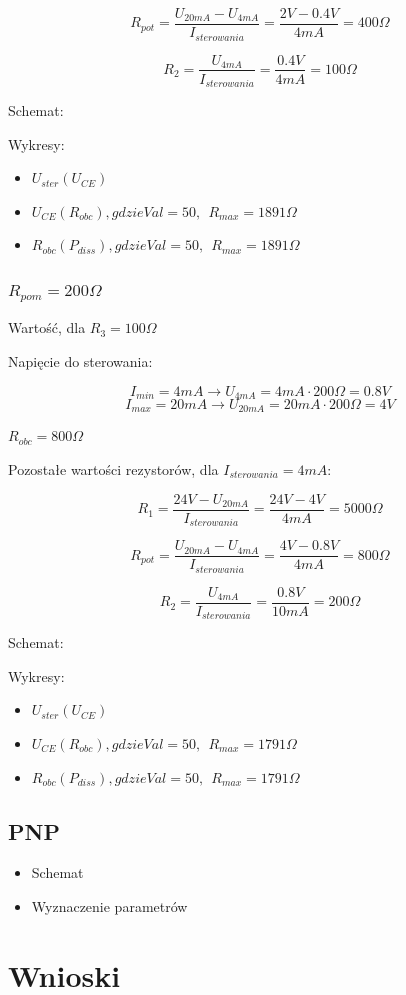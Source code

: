 \documentclass{article}
\begin{document}
$$
    R_{pot} = \frac{U_{20mA} - U_{4mA}}{I_{sterowania}} = 
    \frac{2V-0.4V}{4mA} = 400 \Omega
$$


$$
    R_{2} = \frac{U_{4mA}}{I_{sterowania}} = \frac{0.4V}{4mA} = 100 \Omega
$$

Schemat:

Wykresy:

\begin{itemize}
    \item $U_{ster}(U_{CE})$
    \item $U_{CE}(R_{obc}), gdzie Val = 50, \ \ R_{max} = 1891 \Omega$
    \item $R_{obc}(P_{diss}), gdzie Val = 50, \ \ R_{max} =1891 \Omega$
\end{itemize}


\subsubsection{$R_{pom} = 200 \Omega$}

Wartość, dla $R_{3} = 100 \Omega$

Napięcie do sterowania:

$$
    I_{min} = 4mA \rightarrow U_{4mA} = 4mA \cdot 200 \Omega = 0.8V
$$
$$
    I_{max} = 20mA \rightarrow U_{20mA} = 20mA \cdot 200 \Omega = 4V
$$



$R_{obc} = 800 \Omega$

Pozostałe wartości rezystorów, dla $I_{sterowania} = 4mA$:


$$
    R_{1} = \frac{24V - U_{20mA}}{I_{sterowania}}=\frac{24V - 4V}{4mA} = 5000 \Omega
$$

$$
    R_{pot} = \frac{U_{20mA} - U_{4mA}}{I_{sterowania}} = 
    \frac{4V-0.8V}{4mA} = 800 \Omega
$$


$$
    R_{2} = \frac{U_{4mA}}{I_{sterowania}} = \frac{0.8V}{10mA} = 200 \Omega
$$

Schemat:

Wykresy:


\begin{itemize}
    \item $U_{ster}(U_{CE})$
    \item $U_{CE}(R_{obc}), gdzie Val = 50, \ \ R_{max} = 1791 \Omega$
    \item $R_{obc}(P_{diss}), gdzie Val = 50, \ \ R_{max} =1791 \Omega$
\end{itemize}




\subsection{PNP}

\begin{itemize}
    \item Schemat
    \item Wyznaczenie parametrów
\end{itemize}

\section{Wnioski}
\end{document}
